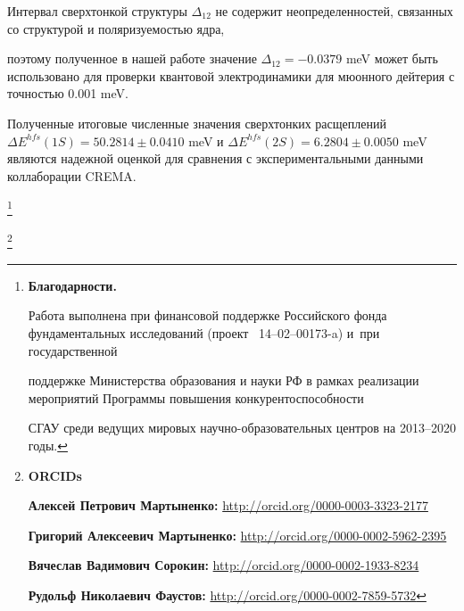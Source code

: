 Интервал сверхтонкой структуры $\Delta_{12}$ не содержит неопределенностей, связанных со структурой и поляризуемостью ядра,

поэтому полученное в нашей работе значение $\Delta_{12}=-0.0379$ meV может быть использовано для проверки квантовой электродинамики для мюонного дейтерия с точностью 0.001 meV.

Полученные итоговые численные значения сверхтонких расщеплений $\Delta E^{hfs}(1S)=50.2814 \pm 0.0410$ meV и $\Delta E^{hfs}(2S)=6.2804 \pm 0.0050$ meV являются надежной оценкой для сравнения с экспериментальными данными коллаборации CREMA.





\thanks{\textbf{Благодарности.} 

Работа выполнена при финансовой поддержке Российского фонда фундаментальных исследований (проект \No~14--02--00173-a) и~при государственной

поддержке Министерства образования и науки РФ в рамках реализации мероприятий Программы повышения конкурентоспособности

СГАУ среди ведущих мировых научно-образовательных центров на 2013–2020 годы.

}



\thanks{{\bf ORCIDs}



{\bf Алексей Петрович Мартыненко:}    \url{http://orcid.org/0000-0003-3323-2177}



{\bf Григорий Алексеевич Мартыненко:} \url{http://orcid.org/0000-0002-5962-2395}



{\bf Вячеслав Вадимович Сорокин:} \url{http://orcid.org/0000-0002-1933-8234}



{\bf Рудольф Николаевич Фаустов:} \url{http://orcid.org/0000-0002-7859-5732}





}



\newpage



\RusRef




